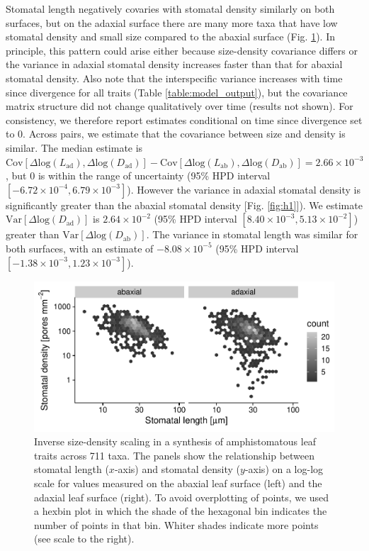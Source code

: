 \documentclass[
  10pt,
]{article}
\begin{document}
Stomatal length negatively covaries with stomatal density similarly on both surfaces, but on the adaxial surface there are many more taxa that have low stomatal density and small size compared to the abaxial surface (Fig. \ref{fig:h1_raw}). In principle, this pattern could arise either because size-density covariance differs or the variance in adaxial stomatal density increases faster than that for abaxial stomatal density. Also note that the interspecific variance increases with time since divergence for all traits (Table \ref{table:model_output}), but the covariance matrix structure did not change qualitatively over time (results not shown). For consistency, we therefore report estimates conditional on time since divergence set to 0. Across pairs, we estimate that the covariance between size and density is similar. The median estimate is \(\text{Cov}[\Delta \text{log}(L_\text{ad}), \Delta \text{log}(D_\text{ad})] - \text{Cov}[\Delta \text{log}(L_\text{ab}), \Delta \text{log}(D_\text{ab})] = 2.66 \times 10^{-3}\), but 0 is within the range of uncertainty (95\% HPD interval \([-6.72 \times 10^{-4},6.79 \times 10^{-3}]\)). However the variance in adaxial stomatal density is significantly greater than the abaxial stomatal density {[}Fig. \ref{fig:h1}{]}). We estimate \(\text{Var}[\Delta \text{log}(D_\text{ad})]\) is \(2.64 \times 10^{-2}\) (95\% HPD interval \([8.40 \times 10^{-3},5.13 \times 10^{-2}]\)) greater than \(\text{Var}[\Delta \text{log}(D_\text{ab})]\). The variance in stomatal length was similar for both surfaces, with an estimate of \(-8.08 \times 10^{-5}\) (95\% HPD interval \([-1.38 \times 10^{-3},1.23 \times 10^{-3}]\)).

\begin{figure}[ht]
\includegraphics[width=\textwidth]{../figures/h1-raw.pdf}
\caption{Inverse size-density scaling in a synthesis of amphistomatous leaf traits across 711 taxa. The panels show the relationship between stomatal length ($x$-axis) and stomatal density ($y$-axis) on a log-log scale for values measured on the abaxial leaf surface (left) and the adaxial leaf surface (right). To avoid overplotting of points, we used a hexbin plot in which the shade of the hexagonal bin indicates the number of points in that bin. Whiter shades indicate more points (see scale to the right).}
\label{fig:h1_raw}
\end{figure}
\end{document}
